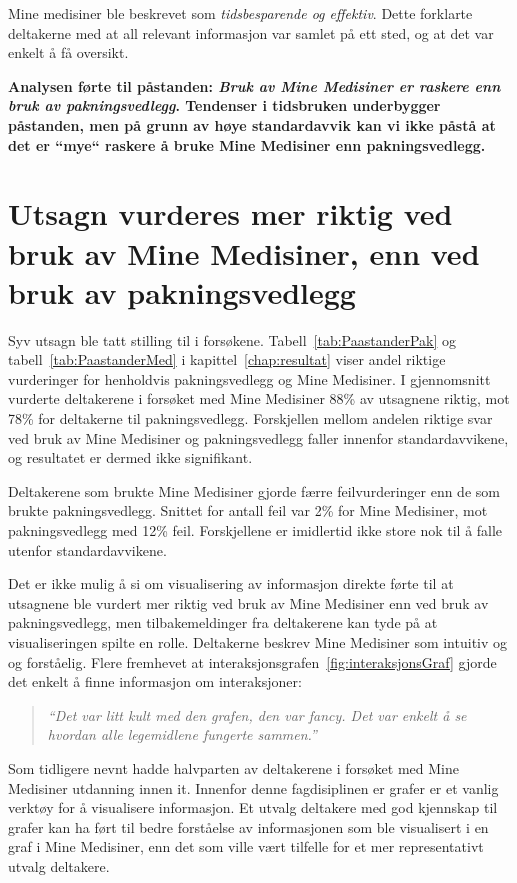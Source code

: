 Mine medisiner ble beskrevet som \textit{tidsbesparende og effektiv}. Dette forklarte deltakerne med at all relevant informasjon var samlet på ett sted, og at det var enkelt å få oversikt. 

\textbf{Analysen førte til påstanden: \textit{Bruk av Mine Medisiner er raskere enn bruk av pakningsvedlegg}. Tendenser i tidsbruken underbygger påstanden, men på grunn av høye standardavvik kan vi ikke påstå at det er “mye`` raskere å bruke Mine Medisiner enn pakningsvedlegg. }

\section[Riktighet]{Utsagn vurderes mer riktig ved bruk av Mine Medisiner, enn ved bruk av pakningsvedlegg}
Syv utsagn ble tatt stilling til i forsøkene. Tabell~\ref{tab:PaastanderPak} og tabell~\ref{tab:PaastanderMed} i kapittel~\ref{chap:resultat} viser andel riktige vurderinger for henholdvis pakningsvedlegg og Mine Medisiner. I gjennomsnitt vurderte deltakerene i forsøket med Mine Medisiner 88\% av utsagnene riktig, mot 78\% for deltakerne til pakningsvedlegg. Forskjellen mellom andelen riktige svar ved bruk av Mine Medisiner og pakningsvedlegg faller innenfor standardavvikene, og resultatet er dermed ikke signifikant. 

Deltakerene som brukte Mine Medisiner gjorde færre feilvurderinger enn de som brukte pakningsvedlegg. Snittet for antall feil var 2\% for Mine Medisiner, mot pakningsvedlegg med 12\% feil. Forskjellene er imidlertid ikke store nok til å falle utenfor standardavvikene. 

Det er ikke mulig å si om visualisering av informasjon direkte førte til at utsagnene ble vurdert mer riktig ved bruk av Mine Medisiner enn ved bruk av pakningsvedlegg, men tilbakemeldinger fra deltakerene kan tyde på at visualiseringen spilte en rolle. Deltakerne beskrev Mine Medisiner som intuitiv og og forståelig. Flere fremhevet at interaksjonsgrafen~\ref{fig:interaksjonsGraf} gjorde det enkelt å finne informasjon om interaksjoner: \begin{quote} \textit{ “Det var litt kult med den grafen, den var fancy. Det var enkelt å se hvordan alle legemidlene fungerte sammen.'' } \end{quote}

Som tidligere nevnt hadde halvparten av deltakerene i forsøket med Mine Medisiner utdanning innen \acrshort{it}. Innenfor denne fagdisiplinen er grafer er et vanlig verktøy for å visualisere informasjon. Et utvalg deltakere med god kjennskap til grafer kan ha ført til bedre forståelse av informasjonen som ble visualisert i en graf i Mine Medisiner, enn det som ville vært tilfelle for et mer representativt utvalg deltakere. 

